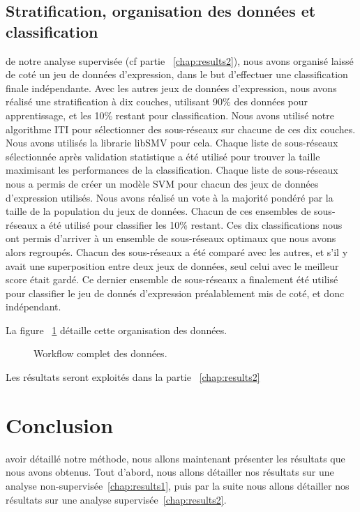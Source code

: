 		\subsection{\textcolor{green!60!black}{Stratification, organisation des données et classification}}
			 de notre analyse supervisée (cf partie ~\ref{chap:results2}), nous avons organisé laissé de coté un jeu de données d'expression, dans le but d'effectuer une classification finale indépendante.
			Avec les autres jeux de données d'expression, nous avons réalisé une stratification à dix couches, utilisant 90\% des données pour apprentissage, et les 10\% restant pour classification.
			Nous avons utilisé notre algorithme ITI pour sélectionner des sous-réseaux sur chacune de ces dix couches.
			Nous avons utilisés la librarie libSMV pour cela.
			Chaque liste de sous-réseaux sélectionnée après validation statistique a été utilisé pour trouver la taille maximisant les performances de la classification.
			Chaque liste de sous-réseaux nous a permis de créer un modèle SVM pour chacun des jeux de données d'expression utilisés.
			Nous avons réalisé un vote à la majorité pondéré par la taille de la population du jeux de données.
			Chacun de ces ensembles de sous-réseaux a été utilisé pour classifier les 10\% restant.
			Ces dix classifications nous ont permis d'arriver à un ensemble de sous-réseaux optimaux que nous avons alors regroupés.
			Chacun des sous-réseaux a été comparé avec les autres, et s'il y avait une superposition entre deux jeux de données, seul celui avec le meilleur score était gardé.
			Ce dernier ensemble de sous-réseaux a finalement été utilisé pour classifier le jeu de donnés d'expression préalablement mis de coté, et donc indépendant.

			La figure ~\ref{fig:Workflow} détaille cette organisation des données.

			\begin{figure}
				\begin{center}
					\def\svgwidth{\columnwidth}
					\caption{Workflow complet des données.}
					\label{fig:Workflow}
				\end{center}
			\end{figure}

			Les résultats seront exploités dans la partie ~\ref{chap:results2}

	\section{\textcolor{green!60!black}{Conclusion}}
		 avoir détaillé notre méthode, nous allons maintenant présenter les résultats que nous avons obtenus. Tout d'abord, nous allons détailler nos résultats sur une analyse non-supervisée~\ref{chap:results1}, puis par la suite nous allons détailler nos résultats sur une analyse supervisée~\ref{chap:results2}.